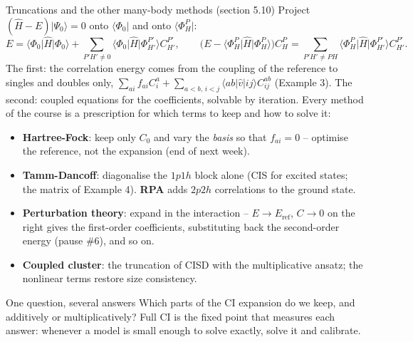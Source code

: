 \documentclass[aspectratio=169,10pt]{beamer}
\newcommand{\ket}[1]{\vert #1\rangle}
\newcommand{\bra}[1]{\langle #1\vert}
\newcommand{\element}[3]{\langle #1\vert #2\vert #3\rangle}
\begin{document}
\begin{frame}{Truncations and the other many-body methods (section 5.10)}
  \footnotesize
  Project $(\hat{H}-E)\ket{\Psi_0}=0$ onto $\bra{\Phi_0}$ and onto $\bra{\Phi_H^P}$:
  \[
    E=\bra{\Phi_0}\hat{H}\ket{\Phi_0}+\sum_{P'H'\neq0}\bra{\Phi_0}\hat{H}\ket{\Phi_{H'}^{P'}}C_{H'}^{P'},
    \qquad
    \bigl(E-\bra{\Phi_H^P}\hat{H}\ket{\Phi_H^P}\bigr)C_H^P=\sum_{P'H'\neq PH}\bra{\Phi_H^P}\hat{H}\ket{\Phi_{H'}^{P'}}C_{H'}^{P'} .
  \]
  The first: the correlation energy comes from the coupling of the reference to singles and doubles only, $\sum_{ai}f_{ai}C_i^a+\sum_{a<b,\,i<j}\element{ab}{\hat{v}}{ij}C_{ij}^{ab}$ (Example 3). The second: coupled equations for the coefficients, solvable by iteration. Every method of the course is a prescription for which terms to keep and how to solve it:
  \begin{itemize}
    \item \textbf{Hartree-Fock}: keep only $C_0$ and vary the \emph{basis} so that $f_{ai}=0$ -- optimise the reference, not the expansion (end of next week).
    \item \textbf{Tamm-Dancoff}: diagonalise the $1p1h$ block alone (CIS for excited states; the matrix of Example 4). \textbf{RPA} adds $2p2h$ correlations to the ground state.
    \item \textbf{Perturbation theory}: expand in the interaction -- $E\to E_{\mathrm{ref}}$, $C\to0$ on the right gives the first-order coefficients, substituting back the second-order energy (pause \#6), and so on.
    \item \textbf{Coupled cluster}: the truncation of CISD with the multiplicative ansatz; the nonlinear terms restore size consistency.
  \end{itemize}
  \begin{exampleblock}{One question, several answers}
    Which parts of the CI expansion do we keep, and additively or multiplicatively? Full CI is the fixed point that measures each answer: whenever a model is small enough to solve exactly, solve it and calibrate.
  \end{exampleblock}
\end{frame}
\end{document}
